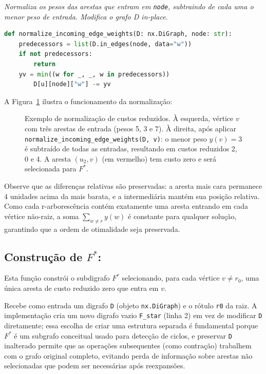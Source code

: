 \begin{tcolorbox}[
        enhanced, breakable,
        colframe=blue!60!black, colback=blue!2,
        colbacktitle=blue!15, coltitle=black,
        title={Normalização por vértice: custos reduzidos},
        boxed title style={sharp corners, boxrule=0.6pt},
        sharp corners, boxrule=0.6pt
    ]
    \emph{Normaliza os pesos das arestas que entram em \texttt{node}, subtraindo de cada uma o menor peso de entrada. Modifica o grafo D in-place.}
    \tcblower
    \begin{lstlisting}[language=Python]
def normalize_incoming_edge_weights(D: nx.DiGraph, node: str):    
    predecessors = list(D.in_edges(node, data="w"))
    if not predecessors:
        return
    yv = min((w for _, _, w in predecessors))
        D[u][node]["w"] -= yv   
\end{lstlisting}
\end{tcolorbox}

A Figura~\ref{fig:normalize-example} ilustra o funcionamento da normalização:

\begin{figure}[H]
    \centering
    
    \caption{Exemplo de normalização de custos reduzidos. À esquerda, vértice \(v\) com três arestas de entrada (pesos 5, 3 e 7). À direita, após aplicar \texttt{normalize\_incoming\_edge\_weights(D, v)}: o menor peso \(y(v)=3\) é subtraído de todas as entradas, resultando em custos reduzidos 2, 0 e 4. A aresta \((u_2,v)\) (em vermelho) tem custo zero e será selecionada para \(F^*\).}
    \label{fig:normalize-example}
\end{figure}

Observe que as diferenças relativas são preservadas: a aresta mais cara permanece 4 unidades acima da mais barata, e a intermediária mantém sua posição relativa. Como cada r-arborescência contém exatamente uma aresta entrando em cada vértice não-raiz, a soma \(\sum_{w\neq r} y(w)\) é constante para qualquer solução, garantindo que a ordem de otimalidade seja preservada.

\subsection{Construção de \texorpdfstring{\(F^*\)}{F*}:}
Esta função constrói o subdigrafo \(F^*\) selecionando, para cada vértice \(v\neq r_0\), uma única aresta de custo reduzido zero que entra em \(v\).

Recebe como entrada um digrafo \texttt{D} (objeto \texttt{nx.DiGraph}) e o rótulo \texttt{r0} da raiz. A implementação cria um novo digrafo vazio \texttt{F\_star} (linha 2) em vez de modificar \texttt{D} diretamente; essa escolha de criar uma estrutura separada é fundamental porque \(F^*\) é um subgrafo conceitual usado para detecção de ciclos, e preservar \texttt{D} inalterado permite que as operações subsequentes (como contração) trabalhem com o grafo original completo, evitando perda de informação sobre arestas não selecionadas que podem ser necessárias após reexpansões.

